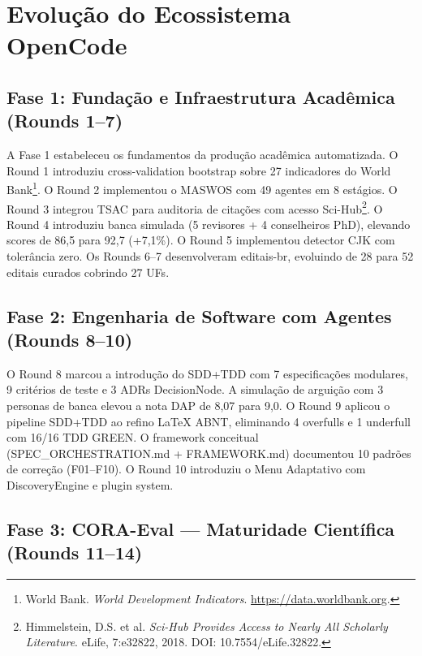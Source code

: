 \documentclass[12pt,a4paper,oneside]{article}
\begin{document}



\section{Evolução do Ecossistema OpenCode}

\subsection{Fase 1: Fundação e Infraestrutura Acadêmica (Rounds 1--7)}

A Fase 1 estabeleceu os fundamentos da produção acadêmica automatizada. O
Round 1 introduziu cross-validation bootstrap sobre 27 indicadores do World
Bank\footnote{World Bank. \textit{World Development Indicators}.
\url{https://data.worldbank.org}.}. O Round 2 implementou o MASWOS com 49
agentes em 8 estágios. O Round 3 integrou TSAC para auditoria de citações
com acesso Sci-Hub\footnote{Himmelstein, D.S. et al. \textit{Sci-Hub Provides
Access to Nearly All Scholarly Literature}. eLife, 7:e32822, 2018. DOI:
10.7554/eLife.32822.}. O Round 4 introduziu banca simulada (5 revisores + 4
conselheiros PhD), elevando scores de 86,5 para 92,7 (+7,1\%). O Round 5
implementou detector CJK com tolerância zero. Os Rounds 6--7 desenvolveram
editais-br, evoluindo de 28 para 52 editais curados cobrindo 27 UFs.

\subsection{Fase 2: Engenharia de Software com Agentes (Rounds 8--10)}

O Round 8 marcou a introdução do SDD+TDD com 7 especificações modulares, 9
critérios de teste e 3 ADRs DecisionNode. A simulação de arguição com 3
personas de banca elevou a nota DAP de 8,07 para 9,0. O Round 9 aplicou o
pipeline SDD+TDD ao refino LaTeX ABNT, eliminando 4 overfulls e 1 underfull
com 16/16 TDD GREEN. O framework conceitual (SPEC\_ORCHESTRATION.md +
FRAMEWORK.md) documentou 10 padrões de correção (F01--F10). O Round 10
introduziu o Menu Adaptativo com DiscoveryEngine e plugin system.

\subsection{Fase 3: CORA-Eval — Maturidade Científica (Rounds 11--14)}
\end{document}
